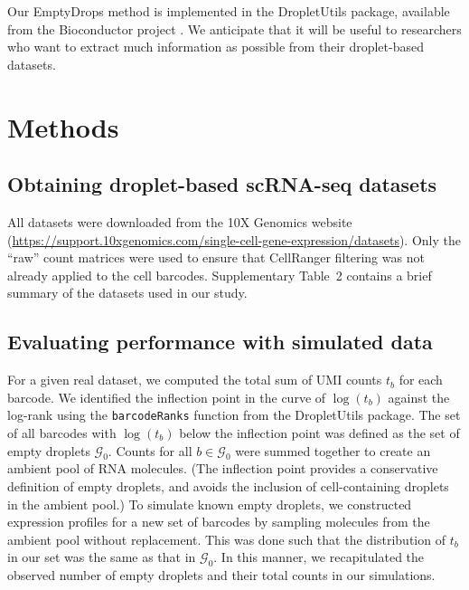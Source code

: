 \documentclass[10pt,letterpaper]{article}
\newcommand{\code}[1]{\texttt{#1}}
\newcommand{\supptabdataset}{2}
\begin{document}
Our EmptyDrops method is implemented in the \textsf{DropletUtils} package, available from the Bioconductor project \cite{huber2015orchestrating}.
We anticipate that it will be useful to researchers who want to extract much information as possible from their droplet-based datasets.

\section*{Methods}

\subsection*{Obtaining droplet-based scRNA-seq datasets}
All datasets were downloaded from the 10X Genomics website (\url{https://support.10xgenomics.com/single-cell-gene-expression/datasets}).
Only the ``raw'' count matrices were used to ensure that CellRanger filtering was not already applied to the cell barcodes.
Supplementary Table~\supptabdataset{} contains a brief summary of the datasets used in our study.

\subsection*{Evaluating performance with simulated data}
For a given real dataset, we computed the total sum of UMI counts $t_b$ for each barcode.
We identified the inflection point in the curve of $\log(t_b)$ against the log-rank using the \code{barcodeRanks} function from the \textsf{DropletUtils} package.
The set of all barcodes with $\log(t_b)$ below the inflection point was defined as the set of empty droplets $\mathcal{G}_0$.
Counts for all $b \in \mathcal{G}_0$ were summed together to create an ambient pool of RNA molecules.
(The inflection point provides a conservative definition of empty droplets, and avoids the inclusion of cell-containing droplets in the ambient pool.)
To simulate known empty droplets, we constructed expression profiles for a new set of barcodes by sampling molecules from the ambient pool without replacement.
This was done such that the distribution of $t_b$ in our set was the same as that in $\mathcal{G}_0$. 
In this manner, we recapitulated the observed number of empty droplets and their total counts in our simulations.
\end{document}
